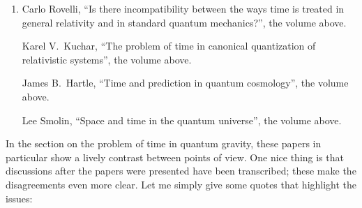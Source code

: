 \documentclass{article}
\begin{document}
\begin{enumerate}
\def\labelenumi{\arabic{enumi})}
\setcounter{enumi}{2}
\item
  Carlo Rovelli, ``Is there incompatibility between the ways time is treated in general
  relativity and in standard quantum mechanics?'', the
  volume above.

 Karel V.\ Kuchar, ``The problem of time in canonical quantization of relativistic systems'', the volume above.

  James B.\ Hartle, ``Time and prediction in quantum cosmology'', the
  volume above.

  Lee Smolin, ``Space and time in the quantum universe'', the volume
  above.
\end{enumerate}
\noindent
In the section on the problem of time in quantum gravity, these papers
in particular show a lively contrast between points of view. One nice
thing is that discussions after the papers were presented have been
transcribed; these make the disagreements even more clear. Let me simply
give some quotes that highlight the issues:
\end{document}
